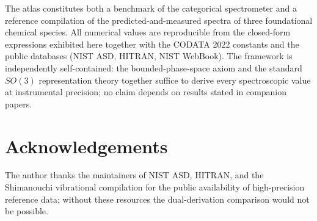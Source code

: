 \documentclass[11pt,a4paper]{article}
\theoremstyle{stmtstyle}
\theoremstyle{definition}
\theoremstyle{remark}
\begin{document}
The atlas constitutes both a benchmark of the categorical spectrometer and a reference compilation of the predicted-and-measured spectra of three foundational chemical species. All numerical values are reproducible from the closed-form expressions exhibited here together with the CODATA 2022 constants and the public databases (NIST ASD, HITRAN, NIST WebBook). The framework is independently self-contained: the bounded-phase-space axiom and the standard $SO(3)$ representation theory together suffice to derive every spectroscopic value at instrumental precision; no claim depends on results stated in companion papers.

\section*{Acknowledgements}

The author thanks the maintainers of NIST ASD, HITRAN, and the Shimanouchi vibrational compilation for the public availability of high-precision reference data; without these resources the dual-derivation comparison would not be possible.



\end{document}

